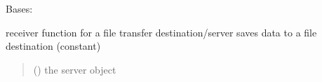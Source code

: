 \documentclass[letterpaper,10pt,english,openany,oneside]{sphinxmanual}
\begin{document}
\begin{fulllineitems}
\label{\detokenize{index:server.FileTransferServer}}
\pysigstartsignatures
\pysigline
{}
\pysigstopsignatures
\sphinxAtStartPar
Bases: 

\begin{fulllineitems}
\label{\detokenize{index:server.FileTransferServer.receive_file}}
\pysigstartsignatures
\pysiglinewithargsret
{}
{}
{}
\pysigstopsignatures
\sphinxAtStartPar
receiver function for a file transfer destination/server saves data to a file destination (constant)
\begin{quote}\begin{description}
\sphinxAtStartPar
{} ({\hyperref[\detokenize{index:server.FileTransferServer}]{}}) \textendash{} the server object

\end{description}\end{quote}

\end{fulllineitems}


\end{fulllineitems}




\renewcommand{\indexname}{Index}
\printindex
\end{document}
